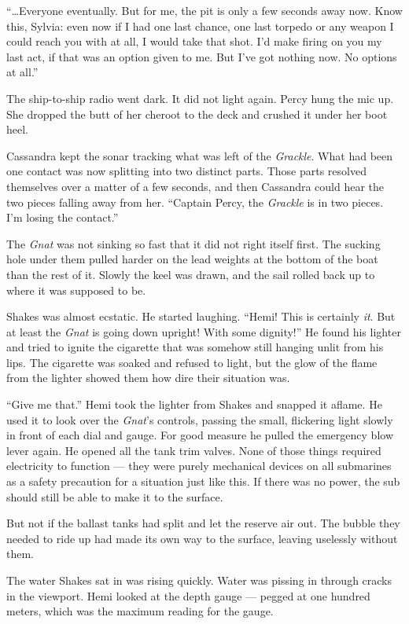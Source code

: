 \documentclass[
]{scrbook}
\begin{document}
``\ldots Everyone eventually. But for me, the pit is only a few seconds
away now. Know this, Sylvia: even now if I had one last chance, one last
torpedo or any weapon I could reach you with at all, I would take that
shot. I'd make firing on you my last act, if that was an option given to
me. But I've got nothing now. No options at all.''

The ship-to-ship radio went dark. It did not light again. Percy hung the
mic up. She dropped the butt of her cheroot to the deck and crushed it
under her boot heel.

Cassandra kept the sonar tracking what was left of the \emph{Grackle}.
What had been one contact was now splitting into two distinct parts.
Those parts resolved themselves over a matter of a few seconds, and then
Cassandra could hear the two pieces falling away from her. ``Captain
Percy, the \emph{Grackle} is in two pieces. I'm losing the contact.''

\bigskip

The \emph{Gnat} was not sinking so fast that it did not right itself
first. The sucking hole under them pulled harder on the lead weights at
the bottom of the boat than the rest of it. Slowly the keel was drawn,
and the sail rolled back up to where it was supposed to be.

Shakes was almost ecstatic. He started laughing. ``Hemi! This is
certainly \emph{it}. But at least the \emph{Gnat} is going down upright!
With some dignity!'' He found his lighter and tried to ignite the
cigarette that was somehow still hanging unlit from his lips. The
cigarette was soaked and refused to light, but the glow of the flame
from the lighter showed them how dire their situation was.

``Give me that.'' Hemi took the lighter from Shakes and snapped it
aflame. He used it to look over the \emph{Gnat}'s controls, passing the
small, flickering light slowly in front of each dial and gauge. For good
measure he pulled the emergency blow lever again. He opened all the tank
trim valves. None of those things required electricity to function ---
they were purely mechanical devices on all submarines as a safety
precaution for a situation just like this. If there was no power, the
sub should still be able to make it to the surface.

But not if the ballast tanks had split and let the reserve air out. The
bubble they needed to ride up had made its own way to the surface,
leaving uselessly without them.

The water Shakes sat in was rising quickly. Water was pissing in through
cracks in the viewport. Hemi looked at the depth gauge --- pegged at one
hundred meters, which was the maximum reading for the gauge.
\end{document}
